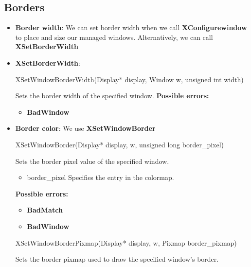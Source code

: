 \documentclass{report}
\begin{document}
    \subsection{Borders}
    \begin{itemize}
        \item \textbf{Border width}: We can set border width when we call \textbf{XConfigurewindow} to place and size our managed windows. Alternatively, we can call \textbf{XSetBorderWidth}
        \item \textbf{XSetBorderWidth}:             
            \bigbreak \noindent 
            \begin{cppcode}
                XSetWindowBorderWidth(Display* display, Window w, unsigned int width)
            \end{cppcode}
            \bigbreak \noindent
            Sets the border width of the specified window.
            \bigbreak \noindent
            \textbf{Possible errors:}
            \begin{itemize}
                \item \textbf{BadWindow}
            \end{itemize}
        \item \textbf{Border color}: We use \textbf{XSetWindowBorder}
            \bigbreak \noindent 
            \begin{cppcode}
                XSetWindowBorder(Display* display, w, unsigned long border_pixel)
            \end{cppcode}
            \bigbreak \noindent
            Sets the border pixel value of the specified window.
            \begin{itemize}
                \item border\_pixel Specifies the entry in the colormap.
            \end{itemize}
            \bigbreak \noindent
            \textbf{Possible errors:}
            \begin{itemize}
                \item \textbf{BadMatch}
                \item \textbf{BadWindow}
            \end{itemize}
            \begin{cppcode}
                XSetWindowBorderPixmap(Display* display, w, Pixmap border_pixmap)
            \end{cppcode}
            \bigbreak \noindent
            Sets the border pixmap used to draw the specified window's border.
            \begin{itemize}

\end{itemize}
\end{itemize}
\end{document}
